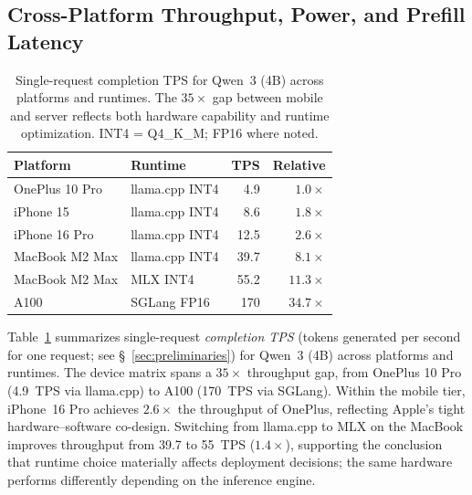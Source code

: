 \documentclass[sigconf,anonymous,review]{acmart}
\begin{document}
\subsection{Cross-Platform Throughput, Power, and Prefill Latency}
\label{sec:crossplatform}
\label{sec:prefill}

\begin{table}[t]
\centering
\caption{Single-request completion TPS for Qwen~3 (4B) across platforms and runtimes. The $35\times$ gap between mobile and server reflects both hardware capability and runtime optimization. INT4 = Q4\_K\_M; FP16 where noted.}
\label{tab:platform-tps}
\small
\begin{tabular}{@{} l l r r @{}}
\toprule
\textbf{Platform} & \textbf{Runtime} & \textbf{TPS} & \textbf{Relative} \\
\midrule
OnePlus 10 Pro   & llama.cpp INT4 & 4.9  & $1.0\times$ \\
iPhone 15        & llama.cpp INT4 & 8.6  & $1.8\times$ \\
iPhone 16 Pro    & llama.cpp INT4 & 12.5 & $2.6\times$ \\
MacBook M2 Max   & llama.cpp INT4 & 39.7 & $8.1\times$ \\
MacBook M2 Max   & MLX INT4       & 55.2 & $11.3\times$ \\
A100             & SGLang FP16    & 170  & $34.7\times$ \\
\bottomrule
\end{tabular}
\end{table}

Table~\ref{tab:platform-tps} summarizes single-request \emph{completion TPS} (tokens generated per second for one request; see §~\ref{sec:preliminaries}) for Qwen~3 (4B) across platforms and runtimes. The device matrix spans a $35\times$ throughput gap, from OnePlus 10 Pro (4.9~TPS via llama.cpp) to A100 (170~TPS via SGLang). Within the mobile tier, iPhone~16 Pro achieves $2.6\times$ the throughput of OnePlus, reflecting Apple's tight hardware--software co-design. Switching from llama.cpp to MLX on the MacBook improves throughput from 39.7 to 55~TPS ($1.4\times$), supporting the conclusion that runtime choice materially affects deployment decisions; the same hardware performs differently depending on the inference engine.
\end{document}
